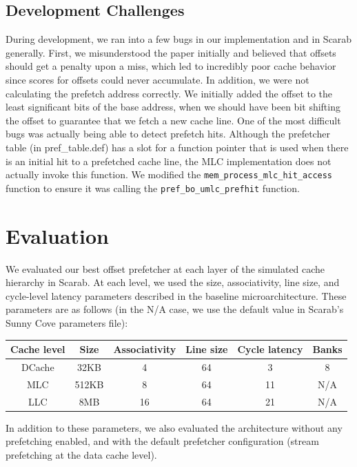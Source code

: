 \documentclass{article}
\begin{document}
\subsection{Development Challenges}
During development, we ran into a few bugs in our implementation and in Scarab generally. First, we misunderstood the paper initially and believed that offsets should get a penalty upon a miss, which led to incredibly poor cache behavior since scores for offsets could never accumulate. In addition, we were
not calculating the prefetch address correctly. We initially added the offset to the least significant bits of the base address, when we should have been bit shifting the offset to guarantee that we fetch a new cache line. 
One of the most difficult bugs was actually being able to detect prefetch hits. Although the prefetcher table (in pref\_table.def) has a slot for a function pointer that is used when there is an initial hit to a prefetched cache line, the MLC implementation does not actually invoke this function.
We modified the \lstinline{mem_process_mlc_hit_access} function to ensure it was calling the \lstinline{pref_bo_umlc_prefhit} function.

\section{Evaluation}
We evaluated our best offset prefetcher at each layer of the simulated cache hierarchy in Scarab. At each level, we used the size, associativity, line size, and cycle-level latency parameters described in the baseline microarchitecture. These parameters are as follows (in the N/A case, we use the default value in Scarab's Sunny Cove parameters file): 

\begin{center}
        \begin{tabular}{ |c|c|c|c|c|c| } 
        \hline
        Cache level & Size & Associativity & Line size & Cycle latency & Banks \\
        \hline
        DCache & 32KB & 4 & 64 & 3 & 8 \\
        \hline
        MLC & 512KB & 8 & 64 & 11 & N/A \\
        \hline 
        LLC & 8MB & 16 & 64 & 21 & N/A \\ 
        \hline
        \end{tabular}
\end{center}

In addition to these parameters, we also evaluated the architecture without any prefetching enabled, and with the default prefetcher configuration (stream prefetching at the data cache level).
\end{document}
